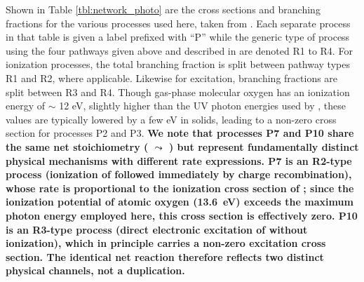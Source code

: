 \documentclass[journal=aesccq,manuscript=article,layout=twocolumn]{achemso}
\begin{document}
\noindent
Shown in Table \ref{tbl:network_photo} are the cross sections and branching fractions for the various processes used here, taken from \citet{mullikin_new_2021}. Each separate process in that table is given a label prefixed with ``P'' while the generic type of process using the four pathways given above and described in \citet{shingledecker_new_2017} are denoted R1 to R4. For ionization processes, the total branching fraction is split between pathway types R1 and R2, where applicable. Likewise for excitation, branching fractions are split between R3 and R4. Though gas-phase molecular oxygen has an ionization energy of $\sim$ 12 eV, slightly higher than the UV photon energies used by \citet{gerakines_ultraviolet_1996}, these values are typically lowered by a few eV in solids, leading to a non-zero cross section for processes P2 and P3. \textbf{We note that processes P7 and P10 share the same net stoichiometry ( $\leadsto$ ) but represent fundamentally distinct physical mechanisms with different rate expressions. P7 is an R2-type process (ionization of  followed immediately by charge recombination), whose rate is proportional to the ionization cross section of ; since the ionization potential of atomic oxygen (13.6~eV) exceeds the maximum photon energy employed here, this cross section is effectively zero. P10 is an R3-type process (direct electronic excitation of  without ionization), which in principle carries a non-zero excitation cross section. The identical net reaction therefore reflects two distinct physical channels, not a duplication.}
\end{document}
